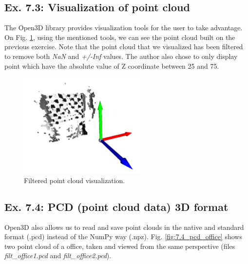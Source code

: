 \documentclass[journal]{IEEEtran}
\begin{document}
\subsection{Ex. 7.3: Visualization of point cloud}

The Open3D library provides visualization tools for the user to take advantage. On Fig. \ref{fig:7.3_pcl}, using the mentioned tools, we can see the point cloud built on the previous exercise. Note that the point cloud that we visualized has been filtered to remove both \emph{NaN} and \emph{+/-Inf} values. The author also chose to only display point which have the absolute value of Z coordinate between 25 and 75.  

\begin{figure}[htp]
  \centering
  \includegraphics[width=2.5in]{imgs/7.3_pcl.png}
  \caption{Filtered point cloud visualization.}
  \label{fig:7.3_pcl}
\end{figure}
\FloatBarrier

\subsection{Ex. 7.4: PCD (point cloud data) 3D format}

Open3D also allows us to read and save point clouds in the native and standard format (.pcd) instead of the NumPy way (.npz). Fig. \ref{fig:7.4_pcd_office} shows two point cloud of a office, taken and viewed from the same perspective (files \emph{filt\_office1.pcd} and \emph{filt\_office2.pcd}).
\end{document}

